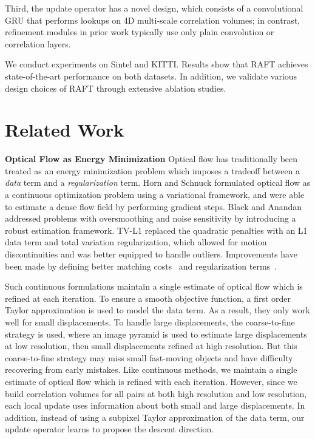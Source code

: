 \documentclass[runningheads]{llncs}
\begin{document}
Third, the update operator has a novel design, which consists of a convolutional GRU that performs lookups on 4D multi-scale correlation volumes; in contrast, refinement modules in prior work typically use only plain convolution or correlation layers. 

We conduct experiments on Sintel\cite{sintel} and KITTI\cite{kitti}. Results show that RAFT achieves state-of-the-art performance on both datasets. In addition, we validate various design choices of RAFT through extensive ablation studies. 


\section{Related Work}


\noindent\textbf{Optical Flow as Energy Minimization}
Optical flow has traditionally been treated as an energy minimization problem which imposes a tradeoff between a \emph{data} term and a \emph{regularization} term. Horn and Schnuck \cite{horn1981determining} formulated optical flow as a continuous optimization problem using a variational framework, and were able to estimate a dense flow field by performing gradient steps. Black and Anandan\cite{black1993framework} addressed problems with oversmoothing and noise sensitivity by introducing a robust estimation framework.  TV-L1 \cite{tvl1} replaced the quadratic penalties with an L1 data term and total variation regularization, which allowed for motion discontinuities and was better equipped to handle outliers. Improvements have been made by defining better matching costs~\cite{deepflow,largedisplacement} and regularization terms~\cite{totalflow}.

Such continuous formulations maintain a single estimate of optical flow which is refined at each iteration.  To ensure a smooth objective function, a first order Taylor approximation is used to model the data term. As a result, they only work well for small displacements. To handle large displacements, the coarse-to-fine strategy is used, where an image pyramid is used to estimate large displacements at low resolution, then small displacements refined at high resolution. But this coarse-to-fine strategy may miss small fast-moving objects and have difficulty recovering from early mistakes. Like continuous methods, we maintain a single estimate of optical flow which is refined with each iteration. However, since we build correlation volumes for all pairs at both high resolution and low resolution, each local update uses information about both small and large displacements. In addition, instead of using a subpixel Taylor approximation of the data term, our update operator learns to propose the descent direction. 
\end{document}
